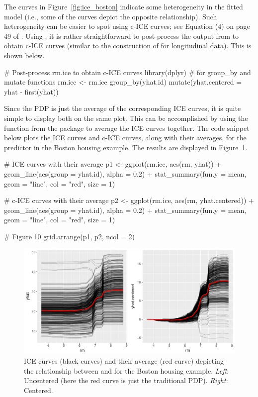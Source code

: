 The curves in Figure~\ref{fig:ice_boston} indicate some heterogeneity in the fitted model (i.e., some of the curves depict the opposite relationship). Such heterogeneity can be easier to spot using c-ICE curves; see Equation (4) on page 49 of \citet{goldstein-peeking-2015}. Using  \citep{dplyr-pkg}, it is rather straightforward to post-process the output from  to obtain c-ICE curves (similar to the construction of  \citep[pg. 130]{fitzmaurice-2011-applied} for longitudinal data). This is shown below.
\begin{example}
# Post-process rm.ice to obtain c-ICE curves
library(dplyr)  # for group_by and mutate functions
rm.ice <- rm.ice %
  group_by(yhat.id) %
  mutate(yhat.centered = yhat - first(yhat))
\end{example}

Since the PDP is just the average of the corresponding ICE curves, it is quite simple to display both on the same plot. This can be accomplished by using the  function from the  package to average the ICE curves together. The code snippet below plots the ICE curves and c-ICE curves, along with their averages, for the predictor  in the Boston housing example. The results are displayed in Figure~\ref{fig:ice_cice_boston}.
\begin{example}
# ICE curves with their average
p1 <- ggplot(rm.ice, aes(rm, yhat)) +
  geom_line(aes(group = yhat.id), alpha = 0.2) +
  stat_summary(fun.y = mean, geom = "line", col = "red", size = 1)

# c-ICE curves with their average
p2 <- ggplot(rm.ice, aes(rm, yhat.centered)) +
  geom_line(aes(group = yhat.id), alpha = 0.2) +
  stat_summary(fun.y = mean, geom = "line", col = "red", size = 1)

# Figure 10
grid.arrange(p1, p2, ncol = 2)
\end{example}
\begin{figure}[!htbp]
  \centering
  \includegraphics[width=1.0\linewidth]{ice_cice_boston}
  \caption{ICE curves (black curves) and their average (red curve) depicting the relationship between  and  for the Boston housing example. \textit{Left}: Uncentered (here the red curve is just the traditional PDP). \textit{Right}: Centered.}
  \label{fig:ice_cice_boston}
\end{figure}


